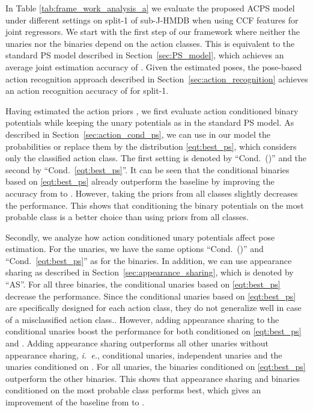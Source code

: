 \documentclass[a4paper, 10pt, conference]{ieeeconf}      \usepackage{FG2017}
\newcommand{\ie}{\mbox{\emph{i. e.}}}
\begin{document}
In Table \ref{tab:frame_work_analysis_a} we evaluate the proposed ACPS model under different settings on split-1 of sub-J-HMDB when using CCF features for joint regressors. We start with the first step of our framework where neither the unaries nor the binaries depend on the action classes. This is equivalent to the standard PS model described in Section~\ref{sec:PS_model}, which achieves an average joint estimation accuracy of . Given the estimated poses, the pose-based action recognition approach described in Section~\ref{sec:action_recognition} achieves an action recognition accuracy of  for split-1.  


Having estimated the action priors , we first evaluate action conditioned binary potentials while keeping the unary potentials as in the standard PS model. As described in Section~\ref{sec:action_cond_ps}, we can use in our model the probabilities  or replace them by the distribution \eqref{eqt:best_ps}, which considers only the classified action class. The first setting is denoted by ``Cond.\ ()'' and the second by ``Cond.\ \eqref{eqt:best_ps}''. It can be seen that the conditional binaries based on \eqref{eqt:best_ps} already outperform the baseline by improving the accuracy from  to . However, taking the priors from all classes slightly decreases the performance. This shows that conditioning the binary potentials on the most probable class is a better choice than using priors from all classes. 

Secondly, we analyze how action conditioned unary potentials affect pose estimation. For the unaries, we have the same options ``Cond.\ ()'' and ``Cond.\ \eqref{eqt:best_ps}'' as for the binaries. In addition, we can use appearance sharing as described in Section~\ref{sec:appearance_sharing}, which is denoted by ``AS''. For all three binaries, the conditional unaries based on \eqref{eqt:best_ps} decrease the performance.
Since the conditional unaries based on \eqref{eqt:best_ps} are specifically designed for each action class, they do not generalize well in case of a misclassified action class.. 
However, adding appearance sharing to the conditional unaries boost the performance for both conditioned on \eqref{eqt:best_ps} and . Adding appearance sharing outperforms  all other unaries without appearance sharing, \ie, conditional unaries, independent unaries and the unaries conditioned on . For all unaries, the binaries conditioned on \eqref{eqt:best_ps} outperform the other binaries.    
This shows that appearance sharing and binaries conditioned on the most probable class performs best, which gives an improvement of the baseline from  to . 
\end{document}
